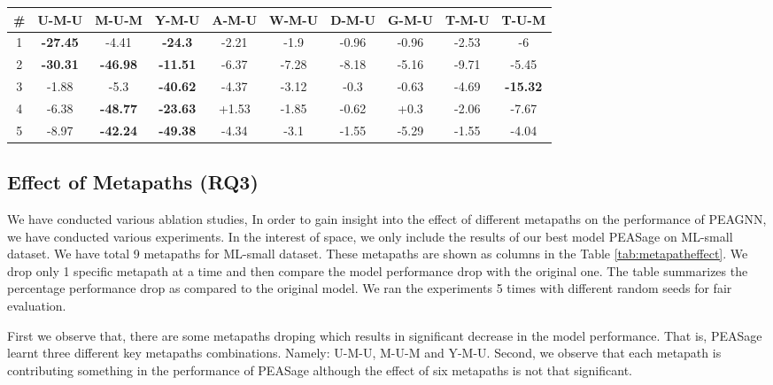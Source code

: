 \documentclass[runningheads, envcountsame, a4paper]{llncs}
\begin{document}
\begin{table*}[t!]
 \vspace{-3mm}
\centering
\begin{tabular}{|c|c|c|c|c|c|c|c|c|c|}
 \hline
   \textbf{\#} & \textbf{U-M-U} & \textbf{M-U-M} & \textbf{Y-M-U} & \textbf{A-M-U} & \textbf{W-M-U} & \textbf{D-M-U} & \textbf{G-M-U} & \textbf{T-M-U} & \textbf{T-U-M}\\
  \hline
    1 & \textbf{-27.45} & -4.41 & \textbf{-24.3} & -2.21 & -1.9 & -0.96 & -0.96 & -2.53 & -6 \\
  \hline
     2 & \textbf{-30.31} & \textbf{-46.98} & \textbf{-11.51} & -6.37 & -7.28 & -8.18 & -5.16 & -9.71 & -5.45 \\
  \hline
     3 & -1.88 & -5.3 & \textbf{-40.62} & -4.37 & -3.12 & -0.3 & -0.63 & -4.69 & \textbf{-15.32} \\
  \hline
    4 & -6.38 & \textbf{-48.77} & \textbf{-23.63} & +1.53 & -1.85 & -0.62 & +0.3 & -2.06 & -7.67 \\
  \hline
    5 & -8.97 & \textbf{-42.24} & \textbf{-49.38} & -4.34 & -3.1 & -1.55 & -5.29 & -1.55 & -4.04 \\
 \hline
\end{tabular}
\caption{Percentage drop in the performance of PEASage on ML-small w.r.t. HR@10 when one metapth is removed during training.
Bold indicates greater than 10\% drop in performance.
(Abbreviation for nodes: U-User, M-Movie, Y-Year, A-Actor, W-Writer, D-Director, G-Genre and T-Tag)}
\label{tab:metapatheffect}
\vspace{-4mm}
\end{table*}
\subsection{Effect of Metapaths (RQ3)}
We have conducted various ablation studies, 
In order to gain insight into the effect of different metapaths 
on the performance of PEAGNN, we have conducted various experiments.
In the interest of space, we only include the results of our best model PEASage on ML-small dataset. 
We have total 9 metapaths for ML-small dataset. These metapaths are shown as columns in the Table \ref{tab:metapatheffect}.
We drop only 1 specific metapath at a time and then compare the model performance drop with the original one. 
The table summarizes the percentage performance drop as compared to the original model.
We ran the experiments 5 times with different random seeds for fair evaluation. 


First we observe that, there are some metapaths droping which results in significant decrease in the model performance.
That is, PEASage learnt three different key metapaths combinations. 
Namely: U-M-U, M-U-M and Y-M-U.
Second, we observe that each metapath is contributing something in the performance of PEASage although the effect of six metapaths is not that significant.
\end{document}
